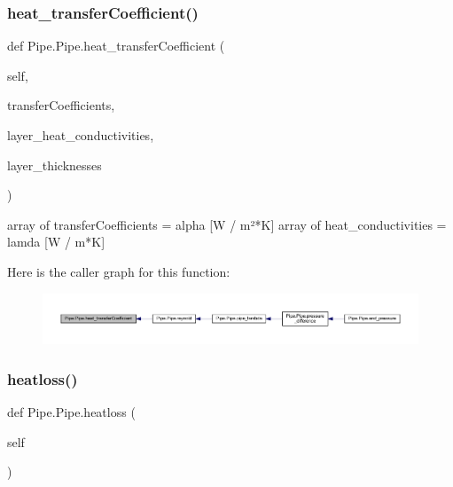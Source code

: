 \mbox{\label{class_pipe_1_1_pipe_a6cda251ee7a5bb112b2dbe8db6a76448}} 
\subsubsection{\texorpdfstring{heat\+\_\+transfer\+Coefficient()}{heat\_transferCoefficient()}}
{\footnotesize\ttfamily def Pipe.\+Pipe.\+heat\+\_\+transfer\+Coefficient (\begin{DoxyParamCaption}\item[{}]{self,  }\item[{}]{transfer\+Coefficients,  }\item[{}]{layer\+\_\+heat\+\_\+conductivities,  }\item[{}]{layer\+\_\+thicknesses }\end{DoxyParamCaption})}

\begin{DoxyVerb}array of transferCoefficients = alpha [W / m²*K]
array of heat_conductivities = lamda [W / m*K]
\end{DoxyVerb}
 Here is the caller graph for this function\+:
\nopagebreak
\begin{figure}[H]
\begin{center}
\leavevmode
\includegraphics[width=350pt]{class_pipe_1_1_pipe_a6cda251ee7a5bb112b2dbe8db6a76448_icgraph}
\end{center}
\end{figure}
\mbox{\label{class_pipe_1_1_pipe_a51bf5b3d3334c008e8cb92c8e8e2e9d1}} 
\subsubsection{\texorpdfstring{heatloss()}{heatloss()}}
{\footnotesize\ttfamily def Pipe.\+Pipe.\+heatloss (\begin{DoxyParamCaption}\item[{}]{self }\end{DoxyParamCaption})}

